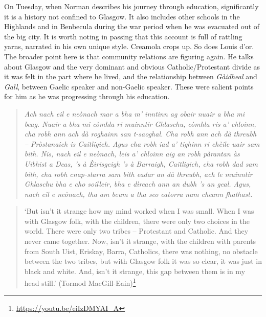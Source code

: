 \documentclass[output=paper,colorlinks,citecolor=brown]{langscibook}
\begin{document}
On Tuesday, when Norman describes his journey through education, significantly it is a history not confined to Glasgow. It also includes other schools in the Highlands and in Benbecula during the war period when he was evacuated out of the big city. It is worth noting in passing that this account is full of rattling yarns, narrated in his own unique style. Creamola crops up. So does Louis d’or. The broader point here is that community relations are figuring again. He talks about Glasgow and the very dominant and obvious Catholic/Protestant divide as it was felt in the part where he lived, and the relationship between \textit{Gàidheal} and \textit{Gall}, between Gaelic speaker and non-Gaelic speaker. These were salient points for him as he was progressing through his education.

\begin{quote}
\textit{Ach nach eil e neònach mar a bha m’ inntinn ag obair nuair a bha mi beag. Nuair a bha mi còmhla ri muinntir Ghlaschu, còmhla ris a’ chloinn, cha robh ann ach dà roghainn san t-saoghal. Cha robh ann ach dà threubh – Pròstanaich is Caitligich. Agus cha robh iad a’ tighinn ri chèile uair sam bith. Nis, nach eil e neònach, leis a’ chloinn aig an robh pàrantan às Uibhist a Deas, ’s à Èirisgeigh ’s à Barraigh, Caitligich, cha robh dad sam bith, cha robh cnap-starra sam bith eadar an dà threubh, ach le muinntir Ghlaschu bha e cho soilleir, bha e dìreach ann an dubh ’s an geal. Agus, nach eil e neònach, tha am beum a tha seo eatorra nam cheann fhathast. }
\end{quote}

\begin{quote}
`But isn’t it strange how my mind worked when I was small. When I was with Glasgow folk, with the children, there were only two choices in the world. There were only two tribes – Protestant and Catholic. And they never came together. Now, isn’t it strange, with the children with parents from South Uist, Eriskay, Barra, Catholics, there was nothing, no obstacle between the two tribes, but with Glasgow folk it was so clear, it was just in black and white. And, isn’t it strange, this gap between them is in my head still.' (Tormod MacGill-Eain)\footnote{\url{https://youtu.be/eiIzDMYAI_A}} 
\end{quote}

\end{document}
